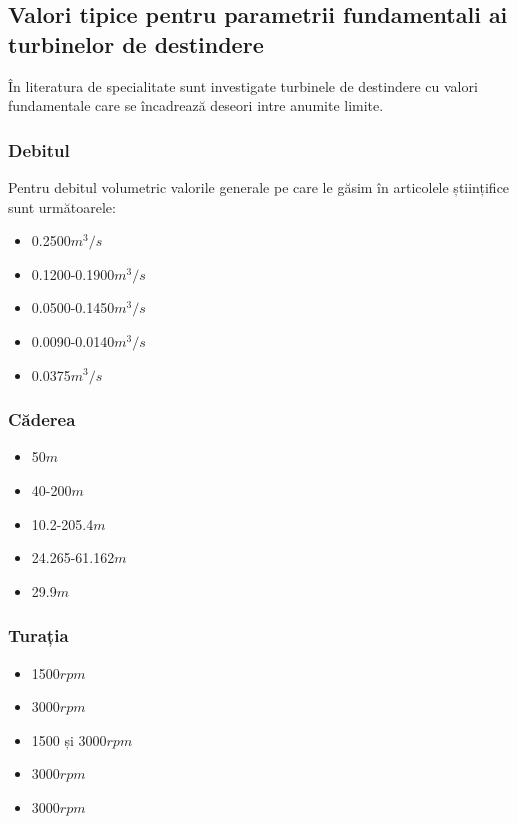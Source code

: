 \subsection{Valori tipice pentru parametrii fundamentali ai turbinelor de destindere}

În literatura de specialitate sunt investigate turbinele de destindere cu valori fundamentale care se încadrează deseori intre anumite limite.


\subsubsection{Debitul}
Pentru debitul volumetric valorile generale pe care le găsim în articolele științifice sunt următoarele:

\begin{itemize}
	\item 0.2500$\si{m^3/s}$ \cite{gentner2000experimentelle}
	\item 0.1200-0.1900$\si{m^3/s}$ \cite{GREES_2014}
	\item 0.0500-0.1450$\si{m^3/s}$ \cite{susanhub}
	\item 0.0090-0.0140$\si{m^3/s}$ \cite{biner2016engineering}
	\item 0.0375$\si{m^3/s}$ \cite{hasmatuchi2014new}
\end{itemize}

\subsubsection{Căderea}

\begin{itemize}
	\item 50$\si{m}$ \cite{gentner2000experimentelle}
	\item 40-200$\si{m}$ \cite{GREES_2014}
	\item 10.2-205.4$\si{m}$ \cite{susanhub}
	\item 24.265-61.162$\si{m}$ \cite{biner2016engineering}
	\item 29.9$\si{m}$ \cite{hasmatuchi2014new}
\end{itemize}


\subsubsection{Turația}

\begin{itemize}
	\item 1500$\si{rpm}$ \cite{gentner2000experimentelle}
	\item 3000$\si{rpm}$ \cite{GREES_2014}
	\item 1500 și 3000$\si{rpm}$ \cite{susanhub}
	\item 3000$\si{rpm}$ \cite{biner2016engineering}
	\item 3000$\si{rpm}$ \cite{hasmatuchi2014new}
\end{itemize}

